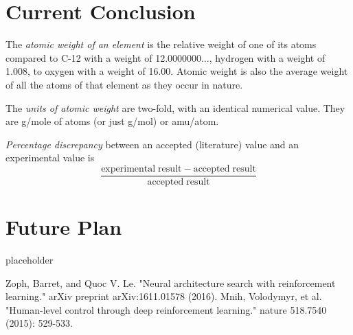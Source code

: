 \documentclass[14pt]{extarticle}
\begin{document}
	

\section{Current Conclusion}

\begin{enumerate}
\begin{item}
The \emph{atomic weight of an element} is the relative weight of one of its atoms compared to C-12 with a weight of 12.0000000$\ldots$, hydrogen with a weight of 1.008, to oxygen with a weight of 16.00. Atomic weight is also the average weight of all the atoms of that element as they occur in nature.
\end{item}
\begin{item}
The \emph{units of atomic weight} are two-fold, with an identical numerical value. They are g/mole of atoms (or just g/mol) or amu/atom.
\end{item}
\begin{item}
\emph{Percentage discrepancy} between an accepted (literature) value and an experimental value is
\begin{equation*}
\frac{\mathrm{experimental\;result} - \mathrm{accepted\;result}}{\mathrm{accepted\;result}}
\end{equation*}
\end{item}
\end{enumerate}


\section{Future Plan}

placeholder




\begin{thebibliography}{99}  
    Zoph, Barret, and Quoc V. Le. "Neural architecture search with reinforcement learning." arXiv preprint arXiv:1611.01578 (2016).
    Mnih, Volodymyr, et al. "Human-level control through deep reinforcement learning." nature 518.7540 (2015): 529-533.
\end{thebibliography}
\end{document}
